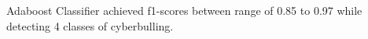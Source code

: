 Adaboost Classifier achieved f1-scores between range of 0.85 to 0.97 while detecting 4 classes of cyberbulling.